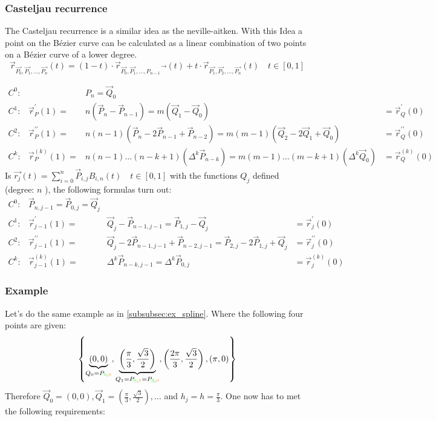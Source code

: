 \subsubsection{Casteljau recurrence}
The Casteljau recurrence is a similar idea as the neville-aitken. With this Idea a point on the Bézier curve can be calculated as a linear combination of two points on a Bézier curve of a lower degree.
$$
\vec{r}_{\overrightarrow{P_{0}}, \overrightarrow{P_{1}}, \ldots, \overrightarrow{P_{n}}}(t)=(1-t) \cdot \vec{r}_{\overrightarrow{P_{0}}, \overrightarrow{P_{1}}, \ldots, P_{n-1}} \overrightarrow{ }(t)+t \cdot \vec{r}_{\overrightarrow{P_{1}}, \overrightarrow{P_{2}}, \ldots, \overrightarrow{P_{n}}}(t) \quad t \in[0,1]
$$

$$
\begin{array}{llll}
C^{0}: & &  P_{n}=\vec{Q}_{0} \\
C^{1}: & \vec{r}_{P}^{\prime}(1)= & n\left(\vec{P}_{n}-\vec{P}_{n-1}\right)=m\left(\vec{Q}_{1}-\vec{Q}_{0}\right) & =\vec{r}_{Q}^{\prime}(0) \\
C^{2}: & \vec{r}_{P}^{\prime \prime}(1)= & n(n-1)\left(\vec{P}_{n}-2 \vec{P}_{n-1}+\vec{P}_{n-2}\right)=m(m-1)\left(\vec{Q}_{2}-2 \vec{Q}_{1}+\vec{Q}_{0}\right) & =\vec{r}_{Q}^{\prime \prime}(0) \\
C^{k}: & \vec{r}_{P}^{(k)}(1)= & n(n-1) \ldots(n-k+1)\left(\Delta^{k} \vec{P}_{n-k}\right)=m(m-1) \ldots(m-k+1)\left(\Delta^{k} \vec{Q}_{0}\right) & =\vec{r}_{Q}^{(k)}(0)
\end{array}
$$
Is $\overrightarrow{r_{j}}(t)=\sum_{i=0}^{n} \vec{P}_{i, j} B_{i, n}(t) \quad t \in[0,1]$ with the functions $Q_{j}$ defined (degree: $n$ ), the following formulas turn out:
$$
\begin{array}{llll}
C^{0}: & \vec{P}_{n, j-1}=\vec{P}_{0, j}=\vec{Q}_{j} \\
C^{1}: & \vec{r}_{j-1}^{\prime}(1)= & \vec{Q}_{j}-\vec{P}_{n-1, j-1}=\vec{P}_{1, j}-\vec{Q}_{j} & =\vec{r}_{j}^{\prime}(0) \\
C^{2}: & \vec{r}_{j-1}^{\prime \prime}(1)= & \vec{Q}_{j}-2 \vec{P}_{n-1, j-1}+\vec{P}_{n-2, j-1}=\vec{P}_{2, j}-2 \vec{P}_{1, j}+\vec{Q}_{j} & =\vec{r}_{j}^{\prime \prime}(0) \\
C^{k}: & \vec{r}_{j-1}^{(k)}(1)= & \Delta^{k} \vec{P}_{n-k, j-1}=\Delta^{k} \vec{P}_{0, j} & =\vec{r}_{j}^{(k)}(0)
\end{array}
$$





\subsubsection{Example}
Let's do the same example as in \autoref{subsubsec:ex_spline}. Where the following four points are given: 
$$\left\{\underbrace{(0,0)}_{Q_0=P_{\textcolor{green}{0}, \textcolor{orange}{0}}},\underbrace{\left(\frac{\pi}{3}, \frac{\sqrt{3}}{2}\right)}_{Q_1=P_{\textcolor{green}{0}, \textcolor{orange}{1}}=P_{\textcolor{green}{3}, \textcolor{orange}{0}}},\left(\frac{2 \pi}{3}, \frac{\sqrt{3}}{2}\right),(\pi, 0)\right\}$$
Therefore $\vec{Q}_0=(0,0), \vec{Q}_1=\left(\frac{\pi}{3}, \frac{\sqrt{3}}{2}\right), \dots$ and $h_j=h=\frac{\pi}{3}$. One now has to met the following requirements: 


